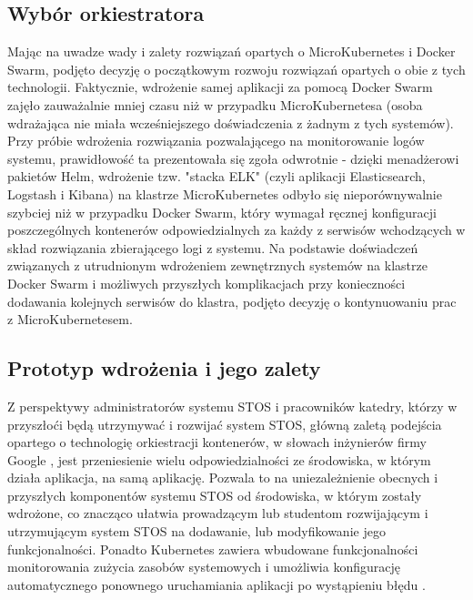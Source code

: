 \subsection{Wybór orkiestratora}
Mając na uwadze wady i zalety rozwiązań opartych o MicroKubernetes i Docker Swarm, podjęto decyzję o początkowym rozwoju rozwiązań opartych o obie z tych technologii. Faktycznie, wdrożenie samej aplikacji za pomocą Docker Swarm zajęło zauważalnie mniej czasu niż w przypadku MicroKubernetesa (osoba wdrażająca nie miała wcześniejszego doświadczenia z żadnym z tych systemów). Przy próbie wdrożenia rozwiązania pozwalającego na monitorowanie logów systemu, prawidłowość ta prezentowała się zgoła odwrotnie - dzięki menadżerowi pakietów Helm, wdrożenie tzw. "stacka ELK" (czyli aplikacji Elasticsearch, Logstash i Kibana) na klastrze MicroKubernetes odbyło się nieporównywalnie szybciej niż w przypadku Docker Swarm, który wymagał ręcznej konfiguracji poszczególnych kontenerów odpowiedzialnych za każdy z serwisów wchodzących w skład rozwiązania zbierającego logi z systemu. Na podstawie doświadczeń związanych z utrudnionym wdrożeniem zewnętrznych systemów na klastrze Docker Swarm i możliwych przyszłych komplikacjach przy konieczności dodawania kolejnych serwisów do klastra, podjęto decyzję o kontynuowaniu prac z MicroKubernetesem.

\subsection{Prototyp wdrożenia i jego zalety}
Z perspektywy administratorów systemu STOS i pracowników katedry, którzy w przyszłoći będą utrzymywać i rozwijać system STOS, główną zaletą podejścia opartego o technologię orkiestracji kontenerów, w słowach inżynierów firmy Google \cite{googleKubernetes}, jest przeniesienie wielu odpowiedzialności ze środowiska, w którym działa aplikacja, na samą aplikację. Pozwala to na uniezależnienie obecnych i przyszłych komponentów systemu STOS od środowiska, w którym zostały wdrożone, co znacząco ułatwia prowadzącym lub studentom rozwijającym i utrzymującym system STOS na dodawanie, lub modyfikowanie jego funkcjonalności. Ponadto Kubernetes zawiera wbudowane funkcjonalności monitorowania zużycia zasobów systemowych i umożliwia konfigurację automatycznego ponownego uruchamiania aplikacji po wystąpieniu błędu \cite{k8sPod}.


